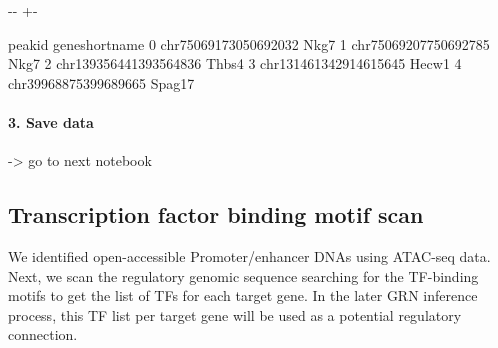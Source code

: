 \documentclass[letterpaper,10pt,english]{sphinxmanual}
\newlength\nbsphinxcodecellspacing
\begin{document}
{

\kern-\sphinxverbatimsmallskipamount\kern-\baselineskip
\kern+\FrameHeightAdjust\kern-\fboxrule
\vspace{\nbsphinxcodecellspacing}

%
\begin{sphinxVerbatim}[commandchars=\\\{\}]
\llap{\color{nbsphinxout}[9]:\,\hspace{\fboxrule}\hspace{\fboxsep}}                   peak\PYGZus{}id gene\PYGZus{}short\PYGZus{}name
0   chr7\PYGZus{}50691730\PYGZus{}50692032            Nkg7
1   chr7\PYGZus{}50692077\PYGZus{}50692785            Nkg7
2  chr13\PYGZus{}93564413\PYGZus{}93564836           Thbs4
3  chr13\PYGZus{}14613429\PYGZus{}14615645           Hecw1
4   chr3\PYGZus{}99688753\PYGZus{}99689665          Spag17
\end{sphinxVerbatim}
}


\paragraph{3. Save data}
\label{\detokenize{notebooks/01_ATAC-seq_data_processing/option2_Bulk_ATAC-seq_data/01_preprocess_Bulk_ATAC_seq_peak_data:3.-Save-data}}
{
%
\begin{sphinxVerbatim}[commandchars=\\\{\}]
\llap{\color{nbsphinxin}[10]:\,\hspace{\fboxrule}\hspace{\fboxsep}}
\end{sphinxVerbatim}
}

-\textgreater{} go to next notebook


\subsection{Transcription factor binding motif scan}
\label{\detokenize{tutorials/motifscan:transcription-factor-binding-motif-scan}}\label{\detokenize{tutorials/motifscan:motifscan}}\label{\detokenize{tutorials/motifscan::doc}}
We identified open-accessible Promoter/enhancer DNAs using ATAC-seq data.
Next, we scan the regulatory genomic sequence searching for the TF-binding motifs to get the list of TFs for each target gene.
In the later GRN inference process, this TF list per target gene will be used as a potential regulatory connection.
\end{document}
